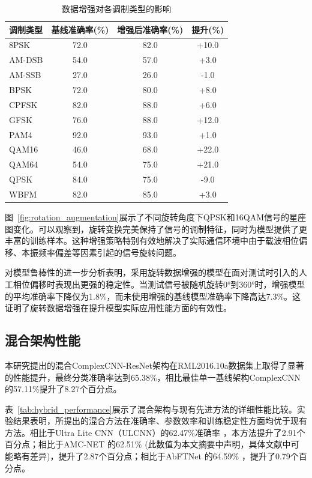 \documentclass[conference]{IEEEtran}
\begin{document}
\begin{table}[h]
\centering
\caption{数据增强对各调制类型的影响}
\label{tab:data_augmentation_results}
\begin{tabular}{@{}lccc@{}}
\toprule
调制类型 & 基线准确率(\%) & 增强后准确率(\%) & 提升(\%) \\
\midrule
8PSK     & 72.0  & 82.0  & +10.0 \\
AM-DSB   & 54.0  & 57.0  & +3.0  \\
AM-SSB   & 27.0  & 26.0  & -1.0  \\
BPSK    
 & 72.0  & 80.0  & +8.0  \\
CPFSK    & 82.0  & 88.0  & +6.0  \\
GFSK     & 76.0  & 88.0  & +12.0 \\
PAM4     & 92.0  & 93.0  & +1.0  \\
QAM16    & 46.0  & 68.0  & +22.0 \\
QAM64    & 54.0  & 75.0  & +21.0 \\
QPSK     & 84.0  & 75.0  & -9.0  \\ %
WBFM     & 82.0  & 85.0  & 
+3.0  \\
\bottomrule
\end{tabular}
\end{table}

图~\ref{fig:rotation_augmentation}展示了不同旋转角度下QPSK和16QAM信号的星座图变化。可以观察到，旋转变换完美保持了信号的调制特征，同时为模型提供了更丰富的训练样本。这种增强策略特别有效地解决了实际通信环境中由于载波相位偏移、本振频率偏差等因素引起的信号旋转问题。

对模型鲁棒性的进一步分析表明，采用旋转数据增强的模型在面对测试时引入的人工相位偏移时表现出更强的稳定性。当测试信号被随机旋转0°到360°时，增强模型的平均准确率下降仅为1.8\%，而未使用增强的基线模型准确率下降高达7.3\%。这证明了旋转数据增强在提升模型实际应用性能方面的有效性。

\subsection{混合架构性能}

本研究提出的混合ComplexCNN-ResNet架构在RML2016.10a数据集上取得了显著的性能提升，最终分类准确率达到65.38\%，相比最佳单一基线架构ComplexCNN的57.11\%提升了8.27个百分点。

表~\ref{tab:hybrid_performance}展示了混合架构与现有先进方法的详细性能比较。实验结果表明，所提出的混合方法在准确率、参数效率和训练稳定性方面均优于现有方法。相比于Ultra Lite CNN（ULCNN）\cite{b1}的62.47\%准确率 \cite{[23_MISSING]}\cite{b1}，本方法提升了2.91个百分点；相比于AMC-NET \cite{b2}的62.51\% (此数值为本文摘要中声明，具体文献中可能略有差异)，提升了2.87个百分点；相比于AbFTNet \cite{b3}的64.59\% \cite{[38_MISSING]}\cite{[41_MISSING]}，提升了0.79个百分点。
\end{document}
